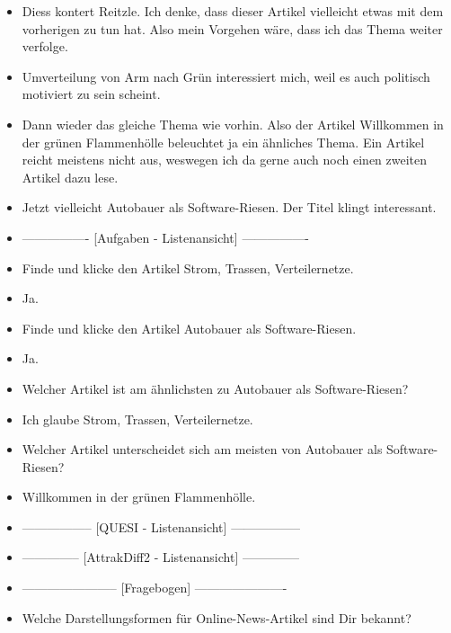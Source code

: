 {\begin{itemize}[]
              Ich würde mich jetzt gerne informieren welchen Zwang das bedeutet und wer dahinter steckt.
        \item {} \flqq Diess kontert Reitzle\frqq{}. Ich denke, dass dieser Artikel vielleicht etwas mit dem vorherigen zu tun hat.
              Also mein Vorgehen wäre, dass ich das Thema weiter verfolge.
        \item {} \flqq Umverteilung von Arm nach Grün\frqq{} interessiert mich, weil es auch politisch motiviert zu sein scheint.
        \item {} Dann wieder das gleiche Thema wie vorhin.
              Also der Artikel \flqq Willkommen in der grünen Flammenhölle\frqq{} beleuchtet ja ein ähnliches Thema.
              Ein Artikel reicht meistens nicht aus, weswegen ich da gerne auch noch einen zweiten Artikel dazu lese.
        \item {} Jetzt vielleicht \flqq Autobauer als Software-Riesen\frqq{}.
              Der Titel klingt interessant.
        \item {----------------} [Aufgaben - Listenansicht] {----------------}
        \item {} Finde und klicke den Artikel \flqq Strom, Trassen, Verteilernetze\frqq{}.
        \item {} Ja.
        \item {} Finde und klicke den Artikel \flqq Autobauer als Software-Riesen\frqq{}.
        \item {} Ja.
        \item {} Welcher Artikel ist am ähnlichsten zu \flqq Autobauer als Software-Riesen\frqq{}?
        \item {} Ich glaube \flqq Strom, Trassen, Verteilernetze\frqq{}.
        \item {} Welcher Artikel unterscheidet sich am meisten von \flqq Autobauer als Software-Riesen\frqq{}?
        \item {} \flqq Willkommen in der grünen Flammenhölle\frqq{}.
        \item {-----------------} [QUESI - Listenansicht] {-----------------}
        \item {--------------} [AttrakDiff2 - Listenansicht] {--------------}
        \item {-----------------------} [Fragebogen] {----------------------}
        \item {} Welche Darstellungsformen für Online-News-Artikel sind Dir bekannt?

\end{itemize}}
